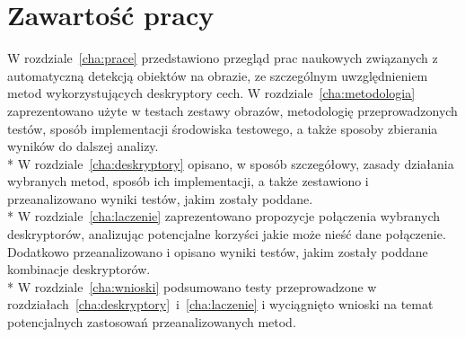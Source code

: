 
\section{Zawartość pracy}
\label{sec:zawartoscPracy}

W rozdziale~\ref{cha:prace} przedstawiono przegląd prac naukowych związanych z automatyczną detekcją obiektów na obrazie, ze szczególnym uwzględnieniem metod wykorzystujących deskryptory cech. W rozdziale~\ref{cha:metodologia} zaprezentowano użyte w testach zestawy obrazów, metodologię przeprowadzonych testów, sposób implementacji środowiska testowego, a także sposoby zbierania wyników do dalszej analizy.\\*
W rozdziale~\ref{cha:deskryptory} opisano, w sposób szczegółowy, zasady działania wybranych metod, sposób ich implementacji, a także zestawiono i przeanalizowano wyniki testów, jakim zostały poddane.\\*
W rozdziale~\ref{cha:laczenie} zaprezentowano propozycje połączenia wybranych deskryptorów, analizując potencjalne korzyści jakie może nieść dane połączenie. Dodatkowo przeanalizowano i opisano wyniki testów, jakim zostały poddane kombinacje deskryptorów.\\*
W rozdziale~\ref{cha:wnioski} podsumowano testy przeprowadzone w rozdziałach~\ref{cha:deskryptory}~i~\ref{cha:laczenie} i wyciągnięto wnioski na temat potencjalnych zastosowań przeanalizowanych metod.